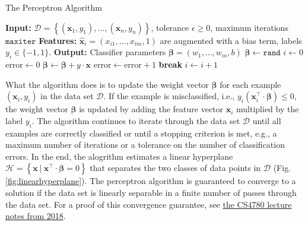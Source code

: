 \documentclass{article}[11pt]
\begin{document}
\begin{algorithm}[H]
    \caption{The Perceptron Algorithm}\label{alg:perceptron}
    \begin{algorithmic}[1]
        \State \textbf{Input:} $\mathcal{D} = \left\{(\mathbf{x}_{1},y_{1}),\dotsc,(\mathbf{x}_{n},y_{n})\right\}$, tolerance $\epsilon\geq{0}$, maximum iterations $\texttt{maxiter}$
        \State \textbf{Features:} $\hat{\mathbf{x}}_{i} = \left(x_{i1},\dots, x_{im},1\right)$ are augmented with a bias term, labels $y_{i}\in\{-1,1\}$.
        \State \textbf{Output:} Classifier parameters $\mathbf{\beta} = \left(w_{1},\dots, w_{m}, b\right)$
        \State $\mathbf{\beta} \gets \texttt{rand}$
        \State $i \gets 0$
        \State $\text{error} \gets 0$
                \State $\mathbf{\beta} \gets \mathbf{\beta} + {y}\cdot\mathbf{x}$
                \State $\text{error} \gets \text{error} + 1$
            \EndIf
        \EndFor
            \State \textbf{break}     
        \EndIf
        \State $i \gets i + 1$
        \EndWhile
    \end{algorithmic}
\end{algorithm}
What the algorithm does is to update the weight vector $\mathbf{\beta}$ for each example $(\mathbf{x}_{i},y_{i})$ in the data set $\mathcal{D}$.
If the example is misclassified, i.e., $y_{i}\left(\mathbf{x}_{i}^{\top}\cdot\mathbf{\beta}\right)\leq{0}$, the weight vector $\mathbf{\beta}$ is updated by adding the feature vector $\mathbf{x}_{i}$ multiplied by the label $y_{i}$.
The algorithm continues to iterate through the data set $\mathcal{D}$ until all examples are correctly classified or until a stopping criterion is met, e.g., a maximum number of iterations or a tolerance on the number of classification errors.
In the end, the alogrithm estimates a linear hyperplane $\mathcal{H} = \left\{\mathbf{x}~|~\mathbf{x}^{\top}\cdot\mathbf{\beta} = 0\right\}$ that separates the two classes of data points in $\mathcal{D}$ (Fig. \ref{fig:linearhyperplane}).
The perceptron algorithm is guaranteed to converge to a solution if the data set is linearly separable in a finite number of passes through the data set.
For a proof of this convergence guarantee, see \href{https://www.cs.cornell.edu/courses/cs4780/2018fa/lectures/lecturenote03.html}{the CS4780 lecture notes from 2018}.
\end{document}
